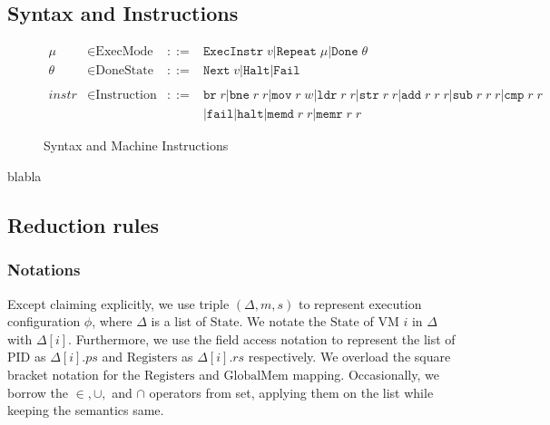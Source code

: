 \documentclass[a4paper]{article}
\newcommand*{\derived}{::=}
\newcommand*{\STATE}{\text{State}}
\newcommand*{\MEM}{\text{GlobalMem}}
\newcommand*{\PID}{\text{PID}}
\newcommand*{\REGS}{\text{Registers}}
\newcommand*{\MODE}{\text{ExecMode}}
\newcommand*{\DONE}{\text{DoneState}}
\newcommand*{\INSTR}{\text{Instruction}}
\newcommand*{\instrm}[1]{\mathtt{#1}}
\newcommand*{\NXT}[1]{\mathtt{Next} \; {#1}}
\begin{document}
\subsection{Syntax and Instructions}
\begin{figure}[h!]
  \begin{align*}
    \mu &\in \MODE &\derived & \mathtt{ExecInstr} \; v | \mathtt{Repeat} \; \mu | \mathtt{Done} \; \theta \\
    \theta &\in \DONE &\derived & \NXT{v} | \mathtt{Halt} | \mathtt{Fail}\\
    \\
    instr & \in  \INSTR &\derived & \instrm{br} \; r |\instrm{bne} \; r \; r |
                                    \instrm{mov} \; r \; w | \instrm{ldr} \; r\; r|
                                    \instrm{str} \; r \; r | \instrm{add} \; r \; r \; r |
                                    \instrm{sub} \; r \; r \; r | \instrm{cmp} \; r \; r \\
        & & & | \instrm{fail} | \instrm{halt} | \instrm{memd} \; r \; r | \instrm{memr} \; r\; r
  \end{align*}
  \caption{Syntax and Machine Instructions}
\end{figure}
 blabla



\subsection{Reduction rules}
\subsubsection{Notations}
Except claiming explicitly, we use triple $(\Delta, m, s)$ to represent
execution configuration $\phi$, where $\Delta$ is a list of $\STATE$. We notate
the $\STATE$ of VM $i$ in $\Delta$ with $\Delta[i]$. Furthermore, we use the
field access notation to represent the list of $\PID$ as $\Delta[i].ps$ and
$\REGS$ as $\Delta[i].rs$ respectively. We overload the square bracket notation
for the $\REGS$ and $\MEM$ mapping. Occasionally, we borrow the $\in, \cup,$ and
$\cap$ operators from set, applying them on the list while keeping the semantics
same.
\end{document}
